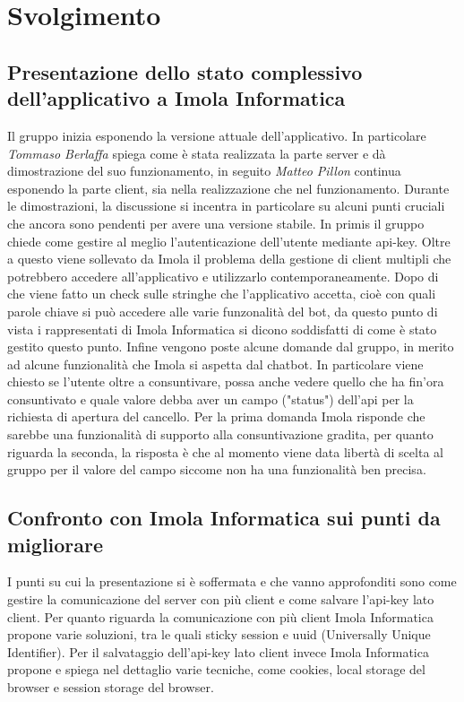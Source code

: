\section{Svolgimento}
\subsection{Presentazione dello stato complessivo dell'applicativo a Imola Informatica}
Il gruppo inizia esponendo la versione attuale dell'applicativo. In particolare \textit{Tommaso Berlaffa} spiega come è stata realizzata la parte server e dà dimostrazione del suo funzionamento, in seguito \textit{Matteo Pillon} continua esponendo la parte client, sia nella realizzazione che nel funzionamento.
Durante le dimostrazioni, la discussione si incentra in particolare su alcuni punti cruciali che ancora sono pendenti per avere una versione stabile. In primis il gruppo chiede come gestire al meglio l'autenticazione dell'utente mediante api-key. Oltre a questo viene sollevato da Imola il problema della gestione di client multipli che potrebbero accedere all'applicativo e utilizzarlo contemporaneamente. Dopo di che viene fatto un check sulle stringhe che l'applicativo accetta, cioè con quali parole chiave si può accedere alle varie funzonalità del bot, da questo punto di vista i rappresentati di Imola Informatica si dicono soddisfatti di come è stato gestito questo punto. Infine vengono poste alcune domande dal gruppo, in merito ad alcune funzionalità che Imola si aspetta dal chatbot. In particolare viene chiesto se l'utente oltre a consuntivare, possa anche vedere quello che ha fin'ora consuntivato e quale valore debba aver un campo ("status") dell'api per la richiesta di apertura del cancello. Per la prima domanda Imola risponde che sarebbe una funzionalità di supporto alla consuntivazione gradita, per quanto riguarda la seconda, la risposta è che al momento viene data libertà di scelta al gruppo per il valore del campo siccome non ha una funzionalità ben precisa.
\subsection{Confronto con Imola Informatica sui punti da migliorare}
I punti su cui la presentazione si è soffermata e che vanno approfonditi sono come gestire la comunicazione del server con più client e come salvare l'api-key lato client. Per quanto riguarda la comunicazione con più client Imola Informatica propone varie soluzioni, tra le quali sticky session e uuid (Universally Unique Identifier). Per il salvataggio dell'api-key lato client invece Imola Informatica propone e spiega nel dettaglio varie tecniche, come cookies, local storage del browser e session storage del browser.